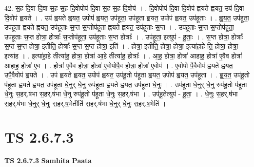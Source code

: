 \documentclass[17pt]{extarticle}
\begin{document}
42. स॒ह दि॒वा दि॒वा स॒ह स॒ह दि॒वोपोप॑ दि॒वा स॒ह स॒ह दि॒वोप॑ । . दि॒वोपोप॑ दि॒वा दि॒वोप॑ ह्वयते ह्वयत॒ उप॑ दि॒वा दि॒वोप॑ ह्वयते । . उप॑ ह्वयते ह्वयत॒ उपोप॑ ह्वयत॒ उप॑हूता॒ उप॑हूता ह्वयत॒ उपोप॑ ह्वयत॒ उप॑हूताः । . ह्व॒य॒त॒ उप॑हूता॒ उप॑हूता ह्वयते ह्वयत॒ उप॑हूताः स॒प्त स॒प्तोप॑हूता ह्वयते ह्वयत॒ उप॑हूताः स॒प्त । . उप॑हूताः स॒प्त स॒प्तोप॑हूता॒ उप॑हूताः स॒प्त होत्रा॒ होत्राः᳚ स॒प्तोप॑हूता॒ उप॑हूताः स॒प्त होत्राः᳚ । . उप॑हूता॒ इत्युप॑ - हू॒ताः॒ । . स॒प्त होत्रा॒ होत्राः᳚ स॒प्त स॒प्त होत्रा॒ इतीति॒ होत्राः᳚ स॒प्त स॒प्त होत्रा॒ इति॑ । . होत्रा॒ इतीति॒ होत्रा॒ होत्रा॒ इत्या॑हा॒हे ति॒ होत्रा॒ होत्रा॒ इत्या॑ह । . इत्या॑हा॒हे तीत्या॑ह॒ होत्रा॒ होत्रा॑ आ॒हे तीत्या॑ह॒ होत्राः᳚ । . आ॒ह॒ होत्रा॒ होत्रा॑ आहाह॒ होत्रा॑ ए॒वैव होत्रा॑ आहाह॒ होत्रा॑ ए॒व । . होत्रा॑ ए॒वैव होत्रा॒ होत्रा॑ ए॒वोपोपै॒व होत्रा॒ होत्रा॑ ए॒वोप॑ । . ए॒वोपो पै॒वैवोप॑ ह्वयते ह्वयत॒ उपै॒वैवोप॑ ह्वयते । . उप॑ ह्वयते ह्वयत॒ उपोप॑ ह्वयत॒ उप॑हू॒तो प॑हूता ह्वयत॒ उपोप॑ ह्वयत॒ उप॑हूता । . ह्व॒य॒त॒ उप॑हू॒तो प॑हूता ह्वयते ह्वयत॒ उप॑हूता धे॒नुर् धे॒नु रुप॑हूता ह्वयते ह्वयत॒ उप॑हूता धे॒नुः । . उप॑हूता धे॒नुर् धे॒नु रुप॑हू॒तो प॑हूता धे॒नुः स॒हर्.ष॑भा स॒हर्.ष॑भा धे॒नु रुप॑हू॒तो प॑हूता धे॒नुः स॒हर्.ष॑भा । . उप॑हू॒तेत्युप॑ - हू॒ता॒ । . धे॒नुः स॒हर्.ष॑भा स॒हर्.ष॑भा धे॒नुर् धे॒नुः स॒हर्.ष॒भेतीति॑ स॒हर्.ष॑भा धे॒नुर् धे॒नुः स॒हर्.ष॒भेति॑ । \newline
\pagebreak
{}
\section*{ TS 2.6.7.3 }

\textbf{TS 2.6.7.3 } \newline
\textbf{Samhita Paata} \newline
\end{document}
